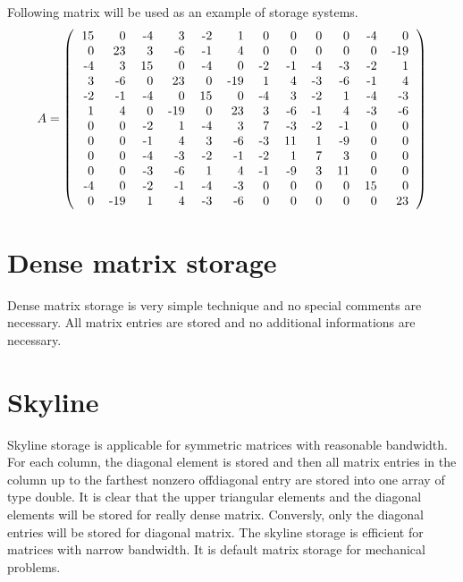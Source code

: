 Following matrix will be used as an example of storage systems.
\begin{equation}\label{prmat}
A=\left(
\begin{tabular}{rrrrrrrrrrrr}
  15 &   0 &  -4 &   3 &  -2 &   1 &   0 &   0 &   0 &   0 &  -4 &  0
\\
   0 &  23 &   3 &  -6 &  -1 &   4 &   0 &   0 &   0 &   0 &   0 & -19
\\
  -4 &   3 &  15 &   0 &  -4 &   0 &  -2 &  -1 &  -4 &  -3 &  -2 &   1
\\
   3 &  -6 &   0 &  23 &   0 & -19 &   1 &   4 &  -3 &  -6 &  -1 &   4
\\
  -2 &  -1 &  -4 &   0 &  15 &   0 &  -4 &   3 &  -2 &   1 &  -4 &  -3
\\
   1 &   4 &   0 & -19 &   0 &  23 &   3 &  -6 &  -1 &   4 &  -3 &  -6
\\
   0 &   0 &  -2 &   1 &  -4 &   3 &   7 &  -3 &  -2 &  -1 &   0 &   0
\\
   0 &   0 &  -1 &   4 &   3 &  -6 &  -3 &  11 &   1 &  -9 &   0 &   0
\\
   0 &   0 &  -4 &  -3 &  -2 &  -1 &  -2 &   1 &   7 &   3 &   0 &   0
\\
   0 &   0 &  -3 &  -6 &   1 &   4 &  -1 &  -9 &   3 &  11 &   0 &   0
\\
  -4 &   0 &  -2 &  -1 &  -4 &  -3 &   0 &   0 &   0 &   0 &  15 &   0
\\
  0 & -19 &   1 &   4 &  -3 &  -6 &   0 &   0 &   0 &   0 &   0 &  23
\end{tabular}
\right)
\end{equation}


\section{Dense matrix storage}
\label{sectdensematstor}
Dense matrix storage is very simple technique and no special comments are necessary.
All matrix entries are stored and no additional informations are necessary.

\section{Skyline}
\label{sectskylinestor}

Skyline storage is applicable for symmetric matrices with reasonable bandwidth.
For each column, the diagonal element is stored and then all matrix entries in the
column up to the farthest nonzero offdiagonal entry are stored into one array
of type double. It is clear that the upper triangular elements and the diagonal
elements will be stored for really dense matrix. Conversly, only the diagonal
entries will be stored for diagonal matrix. The skyline storage is efficient for
matrices with narrow bandwidth. It is default matrix storage for mechanical
problems.

